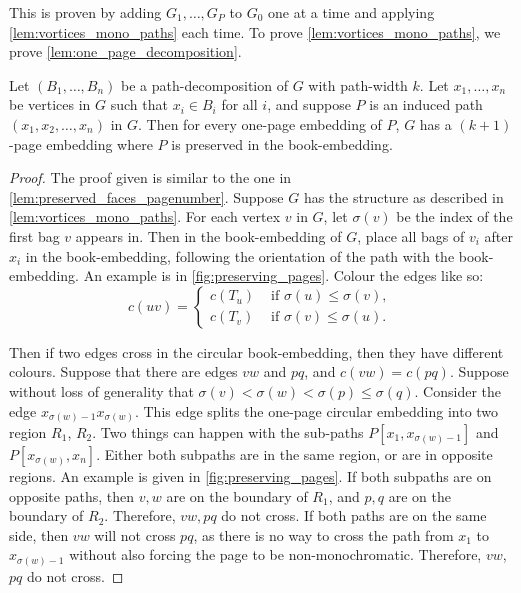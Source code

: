 This is proven by adding $G_1, \ldots, G_P$ to $G_0$ one at a time and applying \cref{lem:vortices_mono_paths} each time. To prove \cref{lem:vortices_mono_paths}, we prove \cref{lem:one_page_decomposition}.
\begin{lemma}\label{lem:one_page_decomposition}
	Let \((B_1, \ldots, B_n)\) be a path-decomposition of \(G\) with path-width \(k\). Let \(x_1, \ldots, x_n\) be vertices in \(G\) such that \(x_i \in B_i\) for all \(i\), and suppose \(P\) is an induced path \((x_1, x_2, \ldots, x_n)\) in \(G\). Then for every one-page embedding of \(P\), \(G\) has a \((k + 1)\)-page embedding where $P$ is preserved in the book-embedding.
\end{lemma}
\begin{proof}
	The proof given is similar to the one in \cref{lem:preserved_faces_pagenumber}. 
	Suppose \(G\) has the structure as described in \cref{lem:vortices_mono_paths}. For each vertex \(v\) in \(G\), let \(\sigma(v)\) be the index of the first bag \(v\) appears in. Then in the book-embedding of \(G\), place all bags of \(v_i\) after \(x_i\) in the book-embedding, following the orientation of the path with the book-embedding. An example is in \cref{fig:preserving_pages}. Colour the edges like so:
	\begin{equation}
		c(uv) =
		\begin{cases}
			c(T_u) & \text{ if } \sigma(u) \leq \sigma(v), \\
			c(T_v) & \text{ if } \sigma(v) \leq \sigma(u).
		\end{cases}
	\end{equation}

	Then if two edges cross in the circular book-embedding, then they have different colours. Suppose that there are edges $vw$ and $pq$, and $c(vw) = c(pq)$.  Suppose without loss of generality that $\sigma(v) < \sigma(w) < \sigma(p) \leq \sigma(q)$. Consider the edge $x_{\sigma(w)-1} x_{\sigma(w)}$. This edge splits the one-page circular embedding into two region $R_1$, $R_2$. Two things can happen with the sub-paths $P[x_1,x_{\sigma(w) - 1}]$ and $P[x_{\sigma(w)}, x_n]$. Either both subpaths are in the same region, or are in opposite regions. An example is given in \cref{fig:preserving_pages}. If both subpaths are on opposite paths, then $v,w$ are on the boundary of $R_1$, and $p, q$ are on the boundary of $R_2$. Therefore, $vw, pq$ do not cross. If both paths are on the same side, then $vw$ will not cross $pq$, as there is no way to cross the path from $x_1$ to $x_{\sigma(w) - 1}$ without also forcing the page to be non-monochromatic. Therefore, $vw$, $pq$ do not cross. 
\end{proof}

